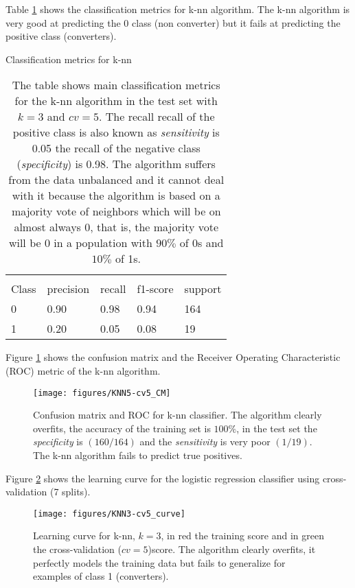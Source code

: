 \documentclass[11pt]{article}
\theoremstyle{definition}
\theoremstyle{remark}
\begin{document}
{Table \ref{tab:knn} shows the classification metrics for k-nn algorithm. The k-nn algorithm is very good at predicting the 0 class (non converter) but it fails at predicting the positive class (converters).
\begin{table}[H]
\caption{Classification metrics for k-nn} 
\begin{center} 
\begin{tabular}{lllll}
\hline
\multicolumn{1}{c}{} \\
Class & precision & recall & f1-score & support     \\
\hline
0 & 0.90  &    0.98   &   0.94   &    164 \\
1 & 0.20  &    0.05   &   0.08   &     19 \\
\hline
\end{tabular}
\caption{The table shows  main classification metrics for the k-nn algorithm in the test set with $k=3$ and $cv=5$. The recall recall of the positive class is also known as \emph{sensitivity} is 0.05 the  recall of the negative class (\emph{specificity}) is 0.98. The algorithm suffers from the data unbalanced and it cannot deal with it because the algorithm is based on a majority vote of neighbors which will be on almost always 0, that is, the majority vote will be 0 in a population with $90\%$ of 0s and $10\%$ of 1s.} \label{tab:knn} 
\end{center}
\end{table}

Figure \ref{fig:knn-cm} shows the confusion matrix and the Receiver Operating Characteristic (ROC) metric of the k-nn algorithm. 

\begin{figure}[H]
        \centering
        \texttt{[image: figures/KNN5-cv5\_CM]}
        \caption{Confusion matrix and ROC for k-nn classifier. The algorithm clearly overfits, the accuracy of the training set is $100\%$, in the test set the \emph{specificity} is $(160/164)$ and the \emph{sensitivity} is very poor $(1/19)$. The k-nn algorithm fails to predict true positives.
        }
\label{fig:knn-cm}
\end{figure}

Figure \ref{fig:knn-cv3} shows the learning curve for the logistic regression classifier using cross-validation (7 splits).
\begin{figure}[H]
        \centering
        \texttt{[image: figures/KNN3-cv5\_curve]}
        \caption{Learning curve for k-nn, $k=3$, in red the training score and in green the cross-validation ($cv=5$)score. The algorithm clearly overfits, it perfectly models the training data but fails to generalize for examples of class 1 (converters).
        } \label{fig:knn-cv3}
\end{figure}


}
\end{document}
